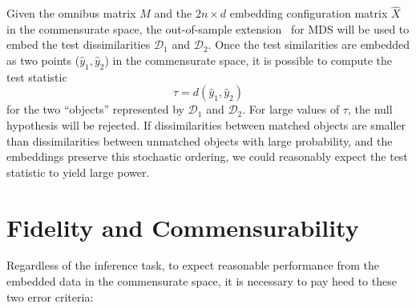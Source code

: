 \documentclass[12pt]{article} %
\begin{document}
  Given the omnibus matrix $M$ and the $2n \times d$ embedding configuration matrix $\hat{X}$ in the commensurate space, the out-of-sample extension~\cite{TrossetOOS} for MDS will be used to embed the test dissimilarities $\mathcal{D}_1$ and $\mathcal{D}_2$.  Once the test similarities are embedded as two points ($\hat{y}_{1},\hat{y}_{2}$) in  the commensurate space, it is possible to  compute the test statistic \[
\tau=d\left(\hat{y}_{1},\hat{y}_{2}\right)\label{teststat}
\] for the two ``objects'' represented by  $\mathcal{D}_1$ and $\mathcal{D}_2$.  For large values of $\tau$, the null hypothesis will be rejected. 
   If  dissimilarities between matched objects are smaller than dissimilarities between unmatched objects with large probability, and the embeddings preserve this stochastic ordering,  we could reasonably expect the test statistic to yield large  power. 
\section{Fidelity and Commensurability\label{sec:FidComm}}



Regardless of the inference task,  to expect reasonable performance from the embedded data in the commensurate space, 
it is necessary to pay heed to these two error criteria: %
\end{document}
